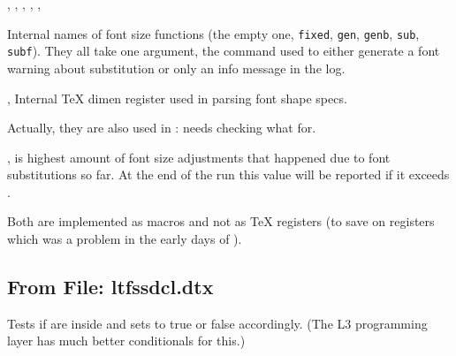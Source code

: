 \documentclass{l3in2edoc}
\begin{document}
\begin{function}[int]
  {
    \empty@sfcnt,
    \fixed@sfcnt,
    \gen@sfcnt,
    \genb@sfcnt,
    \sub@sfcnt,
    \subf@sfcnt
  }
  \begin{syntax}
     
  \end{syntax}
  Internal names of font size functions (the empty one, \texttt{fixed},
  \texttt{gen}, \texttt{genb}, \texttt{sub}, \texttt{subf}). They all
  take one argument, the command used to either generate a font
  warning about substitution or only an info message in the log.
\end{function}






\begin{function}[int]
  {
    \lower@bound,
    \upper@bound
  }
  Internal \TeX{} dimen register used in parsing font shape specs.

  Actually, they are also used in : needs checking what for.
\end{function}



\begin{function}[]
  {
    \fontsubfuzz,
    \font@submax
  }
   is highest amount of font size adjustments that
  happened due to font substitutions so far. At the end of the run
  this value will be reported if it exceeds .

  Both are implemented as macros and not as \TeX{} registers (to save
  on registers which was a problem in the early days of \LaTeXe{}).
\end{function}







\subsection{From File: ltfssdcl.dtx}


\begin{function}[]
  {
    \in@
  }
  \begin{syntax}
      
  \end{syntax}
  Tests if  are inside  and sets
   to true or false accordingly. (The L3 programming layer
  has much better conditionals for this.)
\end{function}
\end{document}
